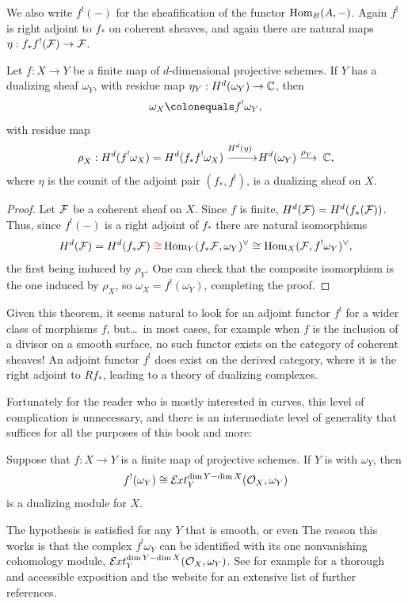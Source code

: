 We also write $f^{!}(-)$ for the sheafification of the functor
$\operatorname{Hom}_{B}(A,-)$. Again $f^{!}$ is right adjoint to $f_{*}$ on coherent
sheaves,
and again there are natural maps $\eta:f_{*}f^{!}({\mathcal F}) \to{\mathcal F}$.

\begin{theorem}\label{canonical as Hom}
\!Let $f{:}X{\to}Y$ be a finite map of $d$-dimensional projective schemes.
If $Y$ has a dualizing sheaf $\omega_{Y}$,
with residue map $\eta_{Y}: H^{d}(\omega_{Y}) \to {\mathbb C}$,
then
$$
\omega_{X} \colonequals f^{!}\omega_{Y},
$$
with residue map
$$
\rho^{}_{X}: H^{d}(f^{!}\omega_{X}) = H^{d}(f_{*}f^{!}\omega_{X}) \,\ruuto
{\!\!H^{d}(\eta)} H^{d}(\omega_{Y}) \ruto {\!\rho^{}_{Y}} \CC,
$$
where $\eta$ is the counit of the adjoint pair $(f_{*},f^{!})$, is a
dualizing sheaf on $X$.
\unif
\end{theorem}

\begin{proof}
Let ${\mathcal F}$ be a coherent sheaf on $X$. Since $f$ is finite,
$H^{d}({\mathcal F}) = H^{d}(f_{*}({\mathcal F}))$. Thus,
since $f^{!}(-)$ is a right adjoint of $f_{*}$ there are natural
isomorphisms
$$
H^{d}(\sF) = H^{d}(f_{*}\sF)
\redden{{}\cong}
\Hom_{Y}(f_{*}\sF, \omega_{Y})^{\vee} \cong
\Hom_{X}(\sF, f^{!}\omega_{Y})^{\vee},
$$
the first being
induced by $\rho^{}_{Y}$. One
can check that the composite
isomorphism is the one induced by $\rho^{}_{X}$, so $\omega_X =
f^{!}(\omega_{Y})$, completing the proof.
\end{proof}

\begin{fact}
Given this theorem, it seems natural to look for an adjoint functor
$f^{!}$ for a wider class of morphisms
$f$, but\dots\ in most cases, for example when $f$ is the inclusion of a
divisor on a smooth surface, no such functor exists on the category of
coherent sheaves!
An adjoint functor
$f^{!}$ does exist on the derived category, where it is the right adjoint
to $Rf_{*}$, leading to a theory
of dualizing complexes.

Fortunately for the reader who is mostly interested in curves, this
level of
complication is unnecessary, and there is an intermediate level of
generality that suffices
for all the purposes of this book and more:

\begin{theorem}\label{general adjunction}
Suppose that $f: X\to Y$ is a finite map of projective schemes. If $Y$ is
%
with
%
$\omega_{Y}$, then
$$
f^{!}(\omega_{Y}) \cong \mathcal E\mkern-1mu xt^{\dim Y-\dim X}_{Y}({\mathcal O}_{X}, \omega_{Y})
$$
is a dualizing module for $X$.
\end{theorem}

The hypothesis is satisfied for any $Y$ that is smooth, or even 
%
The
reason this works is that the complex
$f^{!} \omega_{Y}$
can be identified with its one nonvanishing cohomology module,
$\mathcal E\mkern-1mu xt^{\dim Y-\dim X}_{Y}({\mathcal O}_{X}, \omega_{Y})$.
See for example \cite{AltmanKleiman} for a thorough and accessible
exposition and the website \cite{SixOperations} for an extensive
list of further references. \end{fact}

